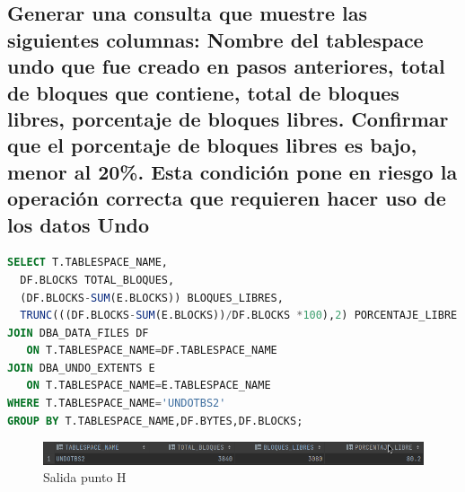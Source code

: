 \documentclass[journal]{IEEEtran}
\begin{document}
\subsection{Generar una consulta que muestre las siguientes columnas: Nombre del tablespace undo que fue creado en pasos anteriores, total de bloques que
contiene, total de bloques libres, porcentaje de bloques libres. Confirmar que el porcentaje de bloques libres es bajo, menor al 20\%. Esta condición
pone en riesgo la operación correcta que requieren hacer uso de los datos Undo}
\begin{lstlisting}[language=sql, caption=sentencia consulta tablespace bloques libres,label={lst:codigo4}]
SELECT T.TABLESPACE_NAME,
  DF.BLOCKS TOTAL_BLOQUES,
  (DF.BLOCKS-SUM(E.BLOCKS)) BLOQUES_LIBRES,
  TRUNC(((DF.BLOCKS-SUM(E.BLOCKS))/DF.BLOCKS *100),2) PORCENTAJE_LIBRE FROM DBA_TABLESPACES T
JOIN DBA_DATA_FILES DF
   ON T.TABLESPACE_NAME=DF.TABLESPACE_NAME
JOIN DBA_UNDO_EXTENTS E
   ON T.TABLESPACE_NAME=E.TABLESPACE_NAME
WHERE T.TABLESPACE_NAME='UNDOTBS2'
GROUP BY T.TABLESPACE_NAME,DF.BYTES,DF.BLOCKS;
\end{lstlisting}
\begin{figure}[H]
  \centering
  \includegraphics[scale=.28]{captura_5.png}
   \caption{Salida punto H}
   \label{fig:validador_5}
\end{figure}
\end{document}
